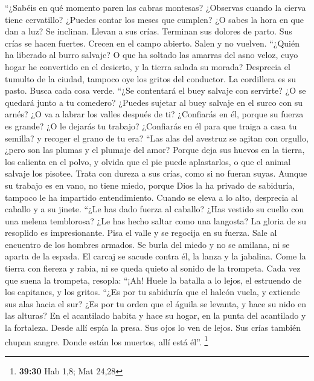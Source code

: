  ``¿Sabéis en qué momento paren las cabras montesas?
¿Observas cuando la cierva tiene cervatillo?  ¿Puedes
contar los meses que cumplen? ¿O sabes la hora en que dan a luz?
 Se inclinan. Llevan a sus crías. Terminan sus dolores de
parto.  Sus crías se hacen fuertes. Crecen en el campo
abierto. Salen y no vuelven.  ``¿Quién ha liberado al
burro salvaje? O que ha soltado las amarras del asno veloz,
 cuyo hogar he convertido en el desierto, y la tierra
salada su morada?  Desprecia el tumulto de la ciudad,
tampoco oye los gritos del conductor.  La cordillera es su
pasto. Busca cada cosa verde.  ``¿Se contentará el buey
salvaje con servirte? ¿O se quedará junto a tu comedero? 
¿Puedes sujetar al buey salvaje en el surco con su arnés? ¿O va a labrar
los valles después de ti?  ¿Confiarás en él, porque su
fuerza es grande? ¿O le dejarás tu trabajo?  ¿Confiarás
en él para que traiga a casa tu semilla? y recoger el grano de tu era?
 ``Las alas del avestruz se agitan con orgullo, ¿pero son
las plumas y el plumaje del amor?  Porque deja sus huevos
en la tierra, los calienta en el polvo,  y olvida que el
pie puede aplastarlos, o que el animal salvaje los pisotee.
 Trata con dureza a sus crías, como si no fueran suyas.
Aunque su trabajo es en vano, no tiene miedo,  porque
Dios la ha privado de sabiduría, tampoco le ha impartido entendimiento.
 Cuando se eleva a lo alto, desprecia al caballo y a su
jinete.  ``¿Le has dado fuerza al caballo? ¿Has vestido
su cuello con una melena temblorosa?  ¿Le has hecho
saltar como una langosta? La gloria de su resoplido es impresionante.
 Pisa el valle y se regocija en su fuerza. Sale al
encuentro de los hombres armados.  Se burla del miedo y
no se amilana, ni se aparta de la espada.  El carcaj se
sacude contra él, la lanza y la jabalina.  Come la tierra
con fiereza y rabia, ni se queda quieto al sonido de la trompeta.
 Cada vez que suena la trompeta, resopla: ``¡Ah! Huele la
batalla a lo lejos, el estruendo de los capitanes, y los gritos.
 ``¿Es por tu sabiduría que el halcón vuela, y extiende
sus alas hacia el sur?  ¿Es por tu orden que el águila se
levanta, y hace su nido en las alturas?  En el acantilado
habita y hace su hogar, en la punta del acantilado y la fortaleza.
 Desde allí espía la presa. Sus ojos lo ven de lejos.
 Sus crías también chupan sangre. Donde están los
muertos, allí está él''. \footnote{\textbf{39:30} Hab 1,8; Mat 24,28}

